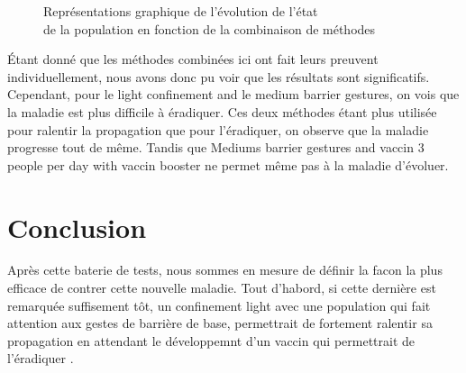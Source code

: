 \documentclass[a4paper, 12pt]{report}
\begin{document}
\begin{figure}[h]
	\caption{Représentations graphique de l'évolution de l'état\\ de la population en fonction de la combinaison de méthodes}
\end{figure}

Étant donné que les méthodes combinées ici ont fait leurs preuvent individuellement, nous avons donc pu voir que les résultats sont significatifs. Cependant, pour le light confinement and le medium barrier gestures, on vois
que la maladie est plus difficile à éradiquer. Ces deux méthodes étant plus utilisée pour ralentir la propagation que pour l'éradiquer, on observe que la maladie progresse tout de même.
Tandis que Mediums barrier gestures and vaccin 3 people per day with vaccin booster ne permet même pas à la maladie d'évoluer.

\newpage

\section{Conclusion}

Après cette baterie de tests, nous sommes en mesure de définir la facon la plus efficace de contrer cette nouvelle maladie. Tout d'habord, si cette dernière est remarquée suffisement tôt,
un confinement light avec une population qui fait attention aux gestes de barrière de base, permettrait de fortement ralentir sa propagation en attendant le développemnt d'un vaccin qui permettrait de l'éradiquer .
\end{document}

